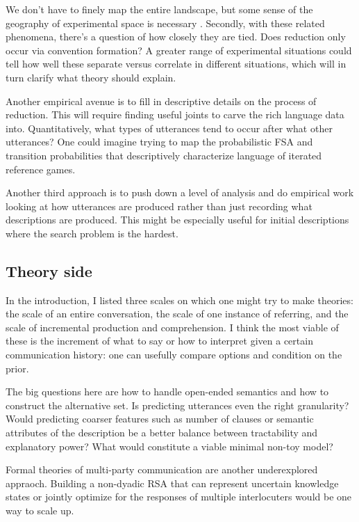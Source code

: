 \documentclass[]{article}
\begin{document}
	We don't have to finely map the entire landscape, but some sense of the geography of experimental space is necessary \citep{20 questions}. Secondly, with these related phenomena, there's a question of how closely they are tied. Does reduction only occur via convention formation? A greater range of experimental situations could tell how well these separate versus correlate in different situations, which will in turn clarify what theory should explain. 
	
	Another empirical avenue is to fill in descriptive details on the process of reduction. This will require finding useful joints to carve the rich language data into. Quantitatively, what types of utterances tend to occur after what other utterances? One could imagine trying to map the probabilistic FSA and transition probabilities that descriptively characterize language of iterated reference games.
	
	Another third approach is to push down a level of analysis and do empirical work looking at how utterances are produced rather than just recording what descriptions are produced. This might be especially useful for initial descriptions where the search problem is the hardest. 
	
	\subsection{Theory side}
	
	In the introduction, I listed three scales on which one might try to make theories: the scale of an entire conversation, the scale of one instance of referring, and the scale of incremental production and comprehension. 
	I think the most viable of these is the increment of what to say or how to interpret given a certain communication history: one can usefully compare options and condition on the prior. 
	
	The big questions here are how to handle open-ended semantics and how to construct the alternative set. Is predicting utterances even the right granularity? Would predicting coarser features such as number of clauses or semantic attributes of the description be a better balance between tractability and explanatory power? What would constitute a viable minimal  non-toy model? 
	
	Formal theories of multi-party communication are another underexplored appraoch. Building a non-dyadic RSA that can represent uncertain knowledge states or jointly optimize for the responses of multiple interlocuters would be one way to scale up. 
	
\end{document}
